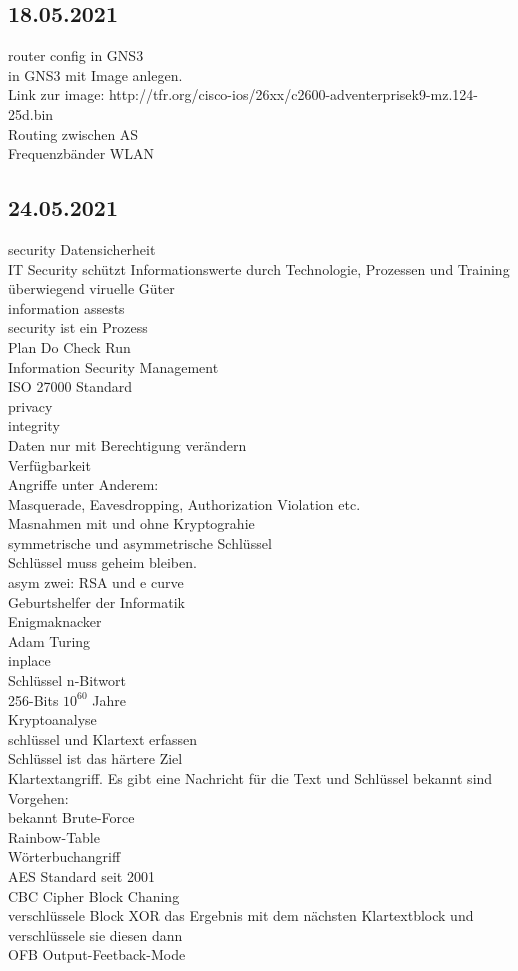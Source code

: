 \documentclass{article}
\begin{document}
	\subsection*{18.05.2021}
	router config in GNS3 \\
	in GNS3 mit Image anlegen. \\
	Link zur image: http://tfr.org/cisco-ios/26xx/c2600-adventerprisek9-mz.124-25d.bin \\
	Routing zwischen AS \\
	Frequenzbänder WLAN \\
	\subsection*{24.05.2021}
	security Datensicherheit \\
	IT Security schützt Informationswerte durch Technologie, Prozessen und Training \\
	überwiegend viruelle Güter \\
	information assests \\
	security ist ein Prozess \\
	Plan Do Check Run \\
	Information Security Management \\
	ISO 27000 Standard \\
	privacy \\
	integrity \\
	Daten nur mit Berechtigung verändern \\
	Verfügbarkeit \\
	Angriffe unter Anderem: \\
	Masquerade, Eavesdropping, Authorization Violation etc. \\
	Masnahmen mit und ohne Kryptograhie\\
	symmetrische und asymmetrische Schlüssel \\
	Schlüssel muss geheim bleiben. \\
	asym zwei: RSA und e curve \\
	Geburtshelfer der Informatik \\
	Enigmaknacker \\
	Adam Turing \\
	inplace \\
	Schlüssel n-Bitwort \\
	256-Bits $10^{60}$ Jahre \\
	Kryptoanalyse \\
	schlüssel und Klartext erfassen \\
	Schlüssel ist das härtere Ziel \\
	Klartextangriff. Es gibt eine Nachricht für die Text und Schlüssel bekannt sind \\
	Vorgehen: \\
	bekannt Brute-Force \\
	Rainbow-Table \\
	Wörterbuchangriff \\
	AES Standard seit 2001 \\
	CBC Cipher Block Chaning \\
	verschlüssele Block XOR das Ergebnis mit dem nächsten Klartextblock und verschlüssele sie diesen dann \\
	OFB Output-Feetback-Mode \\
\end{document}
